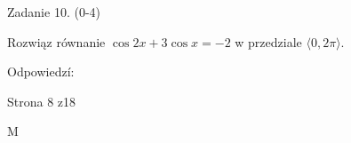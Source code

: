 \documentclass[a4paper,12pt]{article}
\begin{document}
Zadanie 10. (0-4)

Rozwiąz równanie $\cos 2x+3\cos x=-2$ w przedziale $\langle 0, 2\pi\rangle.$

Odpowiedzí:

Strona 8 z18

M
\end{document}
